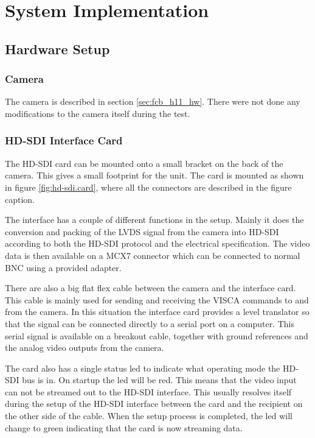 
\chapter{System Implementation}


\section{Hardware Setup}

\subsection{Camera}
The camera is described in section \vref{sec:fcb_h11_hw}. There were not done any modifications 
to the camera itself during the test.

\subsection{HD-SDI Interface Card}
The HD-SDI card can be mounted onto a small bracket on the back of the camera. This gives a small 
footprint for the unit. The card is mounted as shown in figure \ref{fig:hd-sdi.card}, where all the connectors are described in 
the figure caption.

The interface has a couple of different functions in the setup. Mainly it does the conversion and 
packing of the LVDS signal from the camera into HD-SDI according to both the HD-SDI protocol and the electrical specification. 
The video data is then available on a MCX7 connector which can be connected to normal BNC using a provided adapter.

There are also a big flat flex cable between the camera and the interface card. This cable is mainly used for sending and receiving the VISCA commands 
to and from the camera. In this situation the interface card provides a level translator so that the signal can be connected directly to a serial 
port on a computer. This serial signal is available on a breakout cable, together with ground references and the analog video outputs from the camera. 

The card also has a single status led to indicate what operating mode the HD-SDI bus is in. On startup the led will be red. This means that 
the video input can not be streamed out to the HD-SDI interface. This usually resolves itself during the setup of the HD-SDI interface between the 
card and the recipient on the other side of the cable. When the setup process is completed, the led will change to green indicating that 
the card is now streaming data. 

